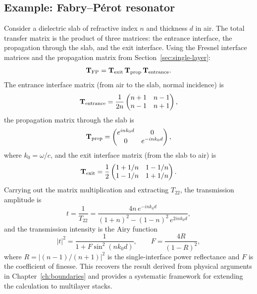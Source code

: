 \subsection{Example: Fabry--P\'erot resonator}
\label{ssec:fp-from-transfer}

Consider a dielectric slab of refractive index $n$ and thickness $d$
in air. The total transfer matrix is the product of three matrices:
the entrance interface, the propagation through the slab, and the exit
interface. Using the Fresnel interface matrices and the propagation
matrix from Section~\ref{sec:single-layer}:
\begin{equation}
 \mathbf{T}_{\mathrm{FP}} = \mathbf{T}_{\mathrm{exit}}\,\mathbf{T}_{\mathrm{prop}}\,\mathbf{T}_{\mathrm{entrance}}.
 \label{eq:fp-transfer-product}
\end{equation}
The entrance interface matrix (from air to the slab, normal incidence)
is
\begin{equation}
 \mathbf{T}_{\mathrm{entrance}} = \frac{1}{2n}
 \begin{pmatrix} n+1 & n-1 \\ n-1 & n+1 \end{pmatrix},
 \label{eq:entrance-interface}
\end{equation}
the propagation matrix through the slab is
\begin{equation}
 \mathbf{T}_{\mathrm{prop}} = \begin{pmatrix}
 e^{ink_0 d} & 0 \\ 0 & e^{-ink_0 d}
 \end{pmatrix},
 \label{eq:fp-propagation-matrix}
\end{equation}
where $k_0 = \omega/c$, and the exit interface matrix (from the slab
to air) is
\begin{equation}
 \mathbf{T}_{\mathrm{exit}} = \frac{1}{2}
 \begin{pmatrix} 1+1/n & 1-1/n \\ 1-1/n & 1+1/n \end{pmatrix}.
 \label{eq:exit-interface}
\end{equation}
Carrying out the matrix multiplication and extracting $T_{22}$, the
transmission amplitude is
\begin{equation}
 t = \frac{1}{T_{22}}
 = \frac{4n\,e^{-ink_0 d}}{(1+n)^2 - (1-n)^2\,e^{2ink_0 d}},
 \label{eq:fp-transmission-amplitude}
\end{equation}
and the transmission intensity is the Airy function
\begin{equation}
 |t|^2 = \frac{1}{1 + F\sin^2(nk_0 d)},
 \qquad F = \frac{4R}{(1-R)^2},
 \label{eq:airy-from-transfer}
\end{equation}
where $R = |(n-1)/(n+1)|^2$ is the single-interface power reflectance
and $F$ is the coefficient of finesse. This recovers the result
derived from physical arguments in Chapter~\ref{ch:boundaries} and
provides a systematic framework for extending the calculation to
multilayer stacks.

